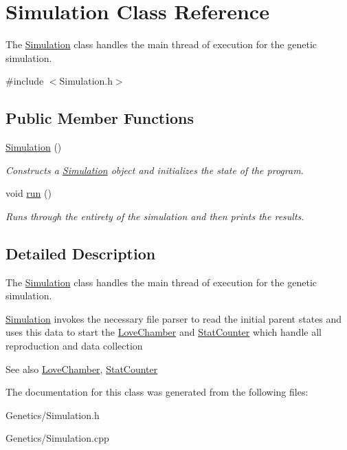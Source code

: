 \hypertarget{class_simulation}{}\section{Simulation Class Reference}
\label{class_simulation}


The \hyperlink{class_simulation}{Simulation} class handles the main thread of execution for the genetic simulation.  




{\ttfamily \#include $<$Simulation.\+h$>$}

\subsection*{Public Member Functions}
\begin{DoxyCompactItemize}
\item 
\hyperlink{class_simulation_a5b224cc5b36bcc8eb29689aff223de41}{Simulation} ()\hypertarget{class_simulation_a5b224cc5b36bcc8eb29689aff223de41}{}\label{class_simulation_a5b224cc5b36bcc8eb29689aff223de41}

\begin{DoxyCompactList}\small\item\em Constructs a \hyperlink{class_simulation}{Simulation} object and initializes the state of the program. \end{DoxyCompactList}\item 
void \hyperlink{class_simulation_ae5c367f87c0b5dc9740bc6d00e44e72c}{run} ()\hypertarget{class_simulation_ae5c367f87c0b5dc9740bc6d00e44e72c}{}\label{class_simulation_ae5c367f87c0b5dc9740bc6d00e44e72c}

\begin{DoxyCompactList}\small\item\em Runs through the entirety of the simulation and then prints the results. \end{DoxyCompactList}\end{DoxyCompactItemize}


\subsection{Detailed Description}
The \hyperlink{class_simulation}{Simulation} class handles the main thread of execution for the genetic simulation. 

\hyperlink{class_simulation}{Simulation} invokes the necessary file parser to read the initial parent states and uses this data to start the \hyperlink{class_love_chamber}{Love\+Chamber} and \hyperlink{class_stat_counter}{Stat\+Counter} which handle all reproduction and data collection \begin{DoxySeeAlso}{See also}
\hyperlink{class_love_chamber}{Love\+Chamber}, \hyperlink{class_stat_counter}{Stat\+Counter} 
\end{DoxySeeAlso}


The documentation for this class was generated from the following files\+:\begin{DoxyCompactItemize}
\item 
Genetics/Simulation.\+h\item 
Genetics/Simulation.\+cpp\end{DoxyCompactItemize}
